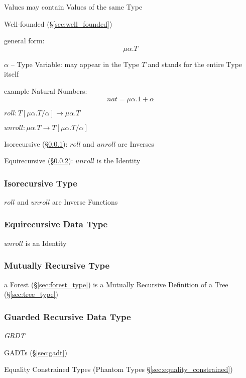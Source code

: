 Values may contain Values of the same Type

Well-founded (\S\ref{sec:well_founded})

general form:
\[
  \mu\alpha.T
\]

$\alpha$ -- Type Variable: may appear in the Type $T$ and stands for
the entire Type itself

example Natural Numbers:
\[
  nat = \mu\alpha.1 + \alpha
\]

$roll : T[\mu\alpha.T/\alpha] \rightarrow \mu\alpha.T$

$unroll : \mu\alpha.T \rightarrow T[\mu\alpha.T/\alpha]$

Isorecursive (\S\ref{sec:isorecursive_type}): $roll$ and $unroll$
are Inverses

Equirecursive (\S\ref{sec:equirecursive_type}): $unroll$ is the
Identity



\subsubsection{Isorecursive Type}\label{sec:isorecursive_type}

$roll$ and $unroll$ are Inverse Functions



\subsubsection{Equirecursive Data Type}\label{sec:equirecursive_type}

$unroll$ is an Identity



\subsubsection{Mutually Recursive Type}
\label{sec:mutually_recursive}\hfill

a Forest (\S\ref{sec:forest_type}) is a Mutually Recursive Definition
of a Tree (\S\ref{sec:tree_type})



\subsubsection{Guarded Recursive Data Type}
\label{sec:grdt}

\emph{GRDT}

\fist GADTs (\S\ref{sec:gadt})

\fist Equality Constrained Types (Phantom Types
\S\ref{sec:equality_constrained})

